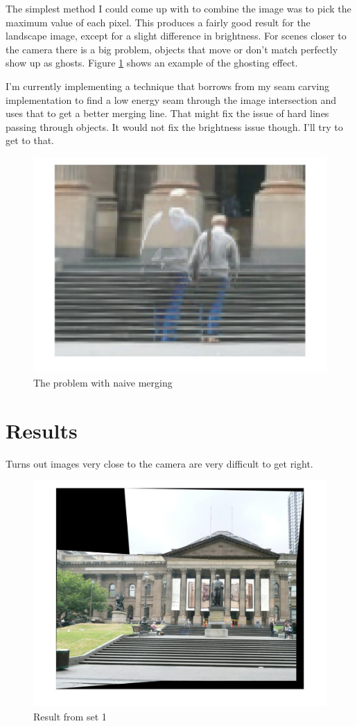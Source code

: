 \documentclass[12pt]{article}
\begin{document}
The simplest method I could come up with to combine the image was to pick the maximum value of each pixel. This produces a fairly good result for the landscape image, except for a slight difference in brightness. For scenes closer to the camera there is a big problem, objects that move or don't match perfectly show up as ghosts. Figure \ref{fig_ghost} shows an example of the ghosting effect.

I'm currently implementing a technique that borrows from my seam carving implementation to find a low energy seam through the image intersection and uses that to get a better merging line. That might fix the issue of hard lines passing through objects. It would not fix the brightness issue though. I'll try to get to that.

\begin{figure}[t!]
    \centering
    \includegraphics[width=0.5\linewidth]{img/set1_ghost2}
    \caption{The problem with naive merging}
    \label{fig_ghost}
\end{figure}

\section{Results}

Turns out images very close to the camera are very difficult to get right.

\begin{figure}[t!]
    \centering
    \includegraphics[width=\linewidth]{img/set1_panorama2}
    \caption{Result from set 1}
    \label{fig_result_1}
\end{figure}
\end{document}
